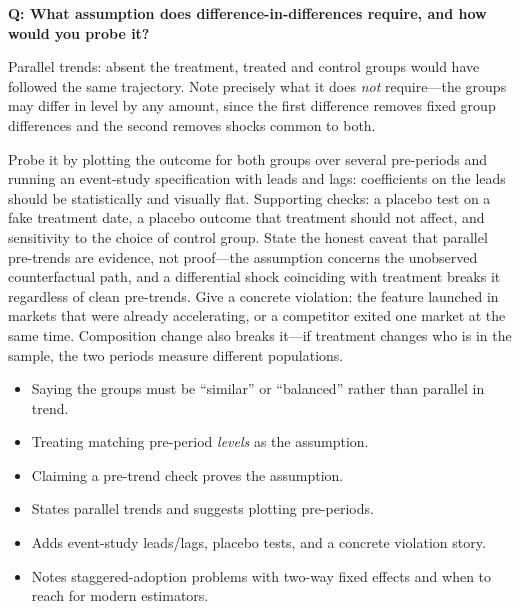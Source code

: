 \begin{interviewq}
\textbf{Q: What assumption does difference-in-differences require, and how would you probe it?}

 \quad {} \quad \badgefreq{\freqmed}

\stronganswer

Parallel trends: absent the treatment, treated and control groups would have followed the same trajectory. Note precisely what it does \emph{not} require---the groups may differ in level by any amount, since the first difference removes fixed group differences and the second removes shocks common to both.

Probe it by plotting the outcome for both groups over several pre-periods and running an event-study specification with leads and lags: coefficients on the leads should be statistically and visually flat. Supporting checks: a placebo test on a fake treatment date, a placebo outcome that treatment should not affect, and sensitivity to the choice of control group. State the honest caveat that parallel pre-trends are evidence, not proof---the assumption concerns the unobserved counterfactual path, and a differential shock coinciding with treatment breaks it regardless of clean pre-trends. Give a concrete violation: the feature launched in markets that were already accelerating, or a competitor exited one market at the same time. Composition change also breaks it---if treatment changes who is in the sample, the two periods measure different populations.

\redflags
\begin{itemize}
    \item Saying the groups must be ``similar'' or ``balanced'' rather than parallel in trend.
    \item Treating matching pre-period \emph{levels} as the assumption.
    \item Claiming a pre-trend check proves the assumption.
\end{itemize}


\goodgreat
\begin{itemize}
    \item {} States parallel trends and suggests plotting pre-periods.
    \item {} Adds event-study leads/lags, placebo tests, and a concrete violation story.
    \item {} Notes staggered-adoption problems with two-way fixed effects and when to reach for modern estimators.
\end{itemize}

\end{interviewq}

